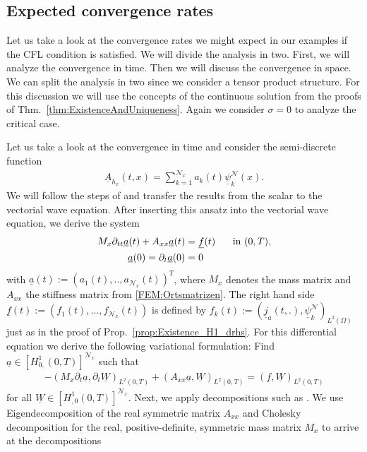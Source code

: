 \documentclass[a4paper,11pt]{article}
\renewcommand{\vec}[1]{\underline{#1}}
\begin{document}
  \subsection{Expected convergence rates}\label{sec:ExpectedConvRate}
	Let us take a look at the convergence rates we might expect in our examples if the CFL condition is satisfied. We will divide the analysis in two. First, we will analyze the convergence in time. Then we will discuss the convergence in space. We can split the analysis in two since we consider a tensor product structure. For this discussion we will use the concepts of the continuous solution from the proofs of Thm.~\ref{thm:ExistenceAndUniqueness}.  Again we consider $\sigma =0$ to analyze the critical case.
	
	Let us take a look at the convergence in time and  consider the semi-discrete function 
	\begin{align*}
		\vec A_{h_x}(t,x) = \sum_{k=1}^{\mathcal N_x}a_k(t) \vec\psi_{k}^{\mathcal{N}}(x).
	\end{align*}
	We will follow the steps of \cite[Sec.~5]{SteinbachZankETNA2020} and transfer the results from the scalar to the vectorial wave equation. After inserting this ansatz into the vectorial wave equation, we derive the system 
	\begin{align*}
		M_x \partial_{tt} \vec{a}(t) + A_{xx} \vec{a}(t) &= \underline{f}(t) \hspace*{.5cm}\textmd{ in } (0,T),\\
		\underline{a}(0) =\partial_{t} \underline{a}(0) &= 0
	\end{align*}
	with $\underline{a}(t) := (a_{1} (t),..,a_{\mathcal N_x}(t))^T$, where $M_x$ denotes the mass matrix and $A_{xx}$ the stiffness matrix from \eqref{FEM:Ortsmatrizen}. The right hand side $\underline{f}(t) :=(f_{1}(t),...,f_{\mathcal N_x}(t))$ is defined by $f_k(t) := ( \vec j_a(t,.), \vec\psi_k^{\mathcal{N}})_{L^2(\Omega)}$ just as in the proof of Prop.~\ref{prop:Existence_H1_drhs}. For this differential equation we derive the following variational formulation: Find $\underline{a} \in [H^1_{0,}(0,T)]^{\mathcal N_x}$ such that
	\begin{align}
		\label{varf:convrate}
		-\left(M_x\partial_t\underline{a}, \partial_t\vec W \right)_{L^2(0,T)}+\left(A_{xx}\underline{a}, \vec W \right)_{L^2(0,T)} = \left(\vec{f}, \vec W \right)_{L^2(0,T)}
	\end{align}
	for all $\underline{W} \in [H^1_{,0}(0,T)]^{\mathcal N_x}$. Next, we apply decompositions such as \cite[Prop.~47.6]{ErnGuermond2020II}. We use Eigendecomposition of the real symmetric matrix $A_{xx}$ and Cholesky decomposition for the  real, positive-definite, symmetric   mass matrix $M_{x}$  to arrive at the decompositions
\end{document}
